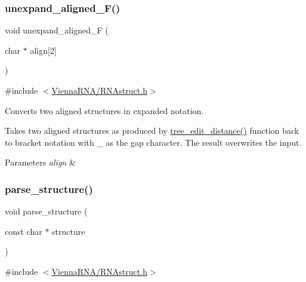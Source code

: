\subsubsection{\texorpdfstring{unexpand\+\_\+aligned\+\_\+\+F()}{unexpand\_aligned\_F()}}
{\footnotesize\ttfamily void unexpand\+\_\+aligned\+\_\+F (\begin{DoxyParamCaption}\item[{char $\ast$}]{align\mbox{[}2\mbox{]} }\end{DoxyParamCaption})}



{\ttfamily \#include $<$\hyperlink{RNAstruct_8h}{Vienna\+R\+N\+A/\+R\+N\+Astruct.\+h}$>$}



Converts two aligned structures in expanded notation. 

Takes two aligned structures as produced by \hyperlink{treedist_8h_a3b21f1925f7071f46d93431a835217bb}{tree\+\_\+edit\+\_\+distance()} function back to bracket notation with \textquotesingle{}\+\_\+\textquotesingle{} as the gap character. The result overwrites the input.


\begin{DoxyParams}{Parameters}
{\em align} & \\
\hline
\end{DoxyParams}
\mbox{\label{group__struct__utils__deprecated_ga3c79042e6bf6f01706bf30ec9e69e8ac}} 
\subsubsection{\texorpdfstring{parse\+\_\+structure()}{parse\_structure()}}
{\footnotesize\ttfamily void parse\+\_\+structure (\begin{DoxyParamCaption}\item[{const char $\ast$}]{structure }\end{DoxyParamCaption})}



{\ttfamily \#include $<$\hyperlink{RNAstruct_8h}{Vienna\+R\+N\+A/\+R\+N\+Astruct.\+h}$>$}



